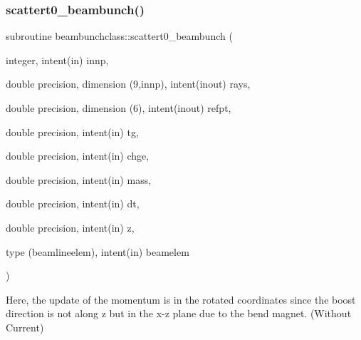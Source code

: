 \subsubsection{\texorpdfstring{scattert0\_beambunch()}{scattert0\_beambunch()}}
{\footnotesize\ttfamily subroutine beambunchclass\+::scattert0\+\_\+beambunch (\begin{DoxyParamCaption}\item[{integer, intent(in)}]{innp,  }\item[{double precision, dimension (9,innp), intent(inout)}]{rays,  }\item[{double precision, dimension (6), intent(inout)}]{refpt,  }\item[{double precision, intent(in)}]{tg,  }\item[{double precision, intent(in)}]{chge,  }\item[{double precision, intent(in)}]{mass,  }\item[{double precision, intent(in)}]{dt,  }\item[{double precision, intent(in)}]{z,  }\item[{type (beamlineelem), intent(in)}]{beamelem }\end{DoxyParamCaption})}



Here, the update of the momentum is in the rotated coordinates since the boost direction is not along z but in the x-\/z plane due to the bend magnet. (Without Current) 

